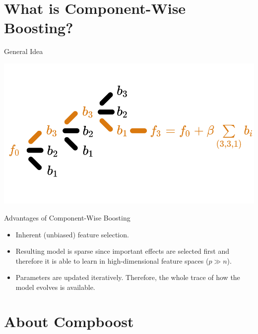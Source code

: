 \documentclass[10pt]{beamer}\usepackage[]{graphicx}\usepackage[]{color}
\begin{document}
\section{What is Component-Wise Boosting?}

\begin{frame}{General Idea}

\begin{center}
\includegraphics[width=\textwidth]{./images/cboost_gif_norisk.png}
\end{center}

\end{frame}

\begin{frame}{Advantages of Component-Wise Boosting}

  \begin{itemize}

    \item
      Inherent (unbiased) feature selection.

    \item
      Resulting model is sparse since important effects are selected first and therefore it is able to learn in high-dimensional feature spaces ($p \gg n$).

    \item
      Parameters are updated iteratively. Therefore, the whole trace of how the model evolves is available.

  \end{itemize}

\end{frame}




\section{About Compboost}
\end{document}
